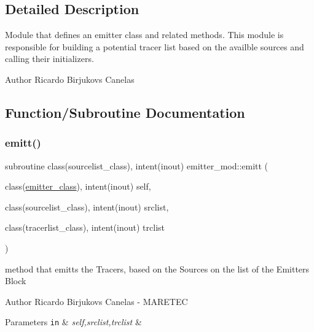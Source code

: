 \subsection{Detailed Description}
Module that defines an emitter class and related methods. This module is responsible for building a potential tracer list based on the availble sources and calling their initializers. 

\begin{DoxyAuthor}{Author}
Ricardo Birjukovs Canelas 
\end{DoxyAuthor}


\subsection{Function/\+Subroutine Documentation}
\mbox{\label{namespaceemitter__mod_a5127564ae5d2f00d214c1518ac420da7}} 
\subsubsection{\texorpdfstring{emitt()}{emitt()}}
{\footnotesize\ttfamily subroutine class(sourcelist\+\_\+class), intent(inout) emitter\+\_\+mod\+::emitt (\begin{DoxyParamCaption}\item[{class(\mbox{\hyperlink{structemitter__mod_1_1emitter__class}{emitter\+\_\+class}}), intent(inout)}]{self,  }\item[{class(sourcelist\+\_\+class), intent(inout)}]{srclist,  }\item[{class(tracerlist\+\_\+class), intent(inout)}]{trclist }\end{DoxyParamCaption})\hspace{0.3cm}{\ttfamily [private]}}



method that emitts the Tracers, based on the Sources on the list of the Emitter\textquotesingle{}s Block 

\begin{DoxyAuthor}{Author}
Ricardo Birjukovs Canelas -\/ M\+A\+R\+E\+T\+EC 
\end{DoxyAuthor}

\begin{DoxyParams}[1]{Parameters}
\mbox{\tt in}  & {\em self,srclist,trclist} & \\
\hline
\end{DoxyParams}


